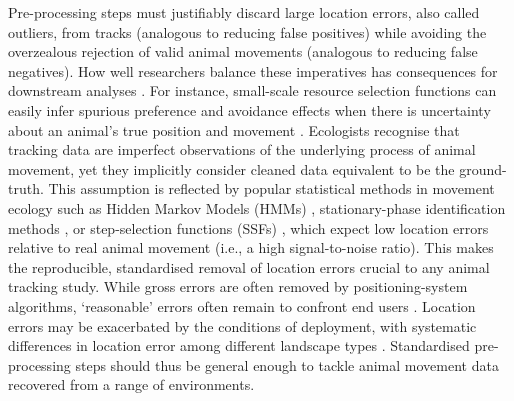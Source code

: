 \documentclass[10pt,paper=a4,headings=standardclasses
]{scrartcl}
\begin{document}
Pre-processing steps must justifiably discard large location errors, also called outliers, from tracks (analogous to reducing false positives) while avoiding the overzealous rejection of valid animal movements (analogous to reducing false negatives).
How well researchers balance these imperatives has consequences for downstream analyses \citep{stine2001}.
For instance, small-scale resource selection functions can easily infer spurious preference and avoidance effects when there is uncertainty about an animal's true position and movement \citep{visscher2006}.
Ecologists recognise that tracking data are imperfect observations of the underlying process of animal movement, yet they implicitly consider cleaned data equivalent to be the ground-truth.
This assumption is reflected by popular statistical methods in movement ecology such as Hidden Markov Models (HMMs) \citep{langrock2012}, stationary-phase identification methods \citep{patin2020a}, or step-selection functions (SSFs) \citep{barnett2008, signer2017, avgar2016}, which expect low location errors relative to real animal movement (i.e., a high signal-to-noise ratio).
This makes the reproducible, standardised removal of location errors crucial to any animal tracking study.
While gross errors are often removed by positioning-system algorithms, ‘reasonable’ errors often remain to confront end users \citep{fischler1981, weiser2016, ranacher2016}.
Location errors may be exacerbated by the conditions of deployment, with systematic differences in location error among different landscape types  \citep[see][]{lewis2007, deon2002, frair2004}. 
Standardised pre-processing steps should thus be general enough to tackle animal movement data recovered from a range of environments.
\end{document}
